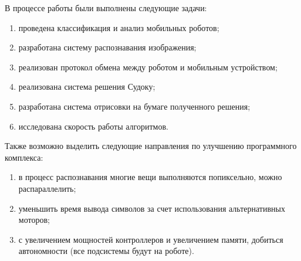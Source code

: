 \Conclusion %

В процессе работы были выполнены следующие задачи:

\begin{enumerate}
    \item проведена классификация и анализ мобильных роботов;
	\item разработана систему распознавания изображения;
	\item реализован протокол обмена между роботом и мобильным устройством; 
	\item реализована система решения Судоку;
	\item разработана система отрисовки на бумаге полученного решения;
	\item исследована скорость работы алгоритмов.
\end{enumerate}

Также возможно выделить следующие направления по улучшению программного комплекса:

\begin{enumerate}
    \item в процесс распознавания многие вещи выполняются попиксельно, можно распараллелить;
	\item уменьшить время вывода символов за счет использования альтернативных моторов;
	\item с увеличением мощностей контроллеров и увеличением памяти, добиться автономности (все подсистемы будут на роботе).
\end{enumerate}

